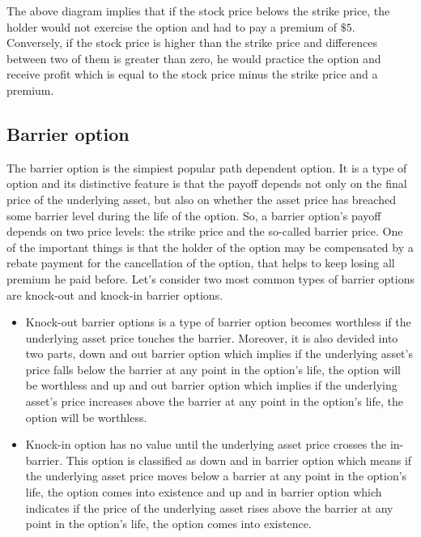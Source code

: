 The above diagram implies that if the stock price belows the strike price, the holder would not exercise the option and had to pay a premium of $\$5$. Conversely, if the stock price is higher than the strike price and differences between two of them is greater than zero, he would practice the option and receive profit which is equal to the stock price minus the strike price and a premium. 
	
	\subsection{Barrier option}
	The barrier option is the simpiest popular path dependent option. It is a type of option and its distinctive feature is that the payoff depends not
	only on the final price of the underlying asset, but also on whether the asset price has
	breached some barrier level during the life of the option. So, a barrier option’s payoff depends on two price levels:
	the strike price and the so-called barrier price. One of the important things is that the holder of the option may be compensated
	by a rebate payment for the cancellation of the option, that helps to keep losing all premium he paid before. Let's consider two most common types of barrier options are knock-out and knock-in barrier options. 	
	\begin{itemize}
		\item Knock-out barrier options is a type of barrier option becomes worthless if the underlying asset price touches the barrier. Moreover, it is also devided into two parts, down and out barrier option which implies if the underlying asset's price falls below the barrier at any point in the option's life, the option will be worthless and up and out barrier option which implies if the underlying asset’s price increases above the barrier at any point in the option’s life, the option will be worthless.
			
	\item Knock-in option has no value until the underlying asset price crosses the in-barrier. This option is classified as down and in barrier option which means if the underlying asset price moves below a barrier at any point in the option’s life, the option comes into existence and up and in barrier option which indicates if the price of the underlying asset rises above the barrier at any point in the option’s life, the option comes into existence.	
	\end{itemize}
